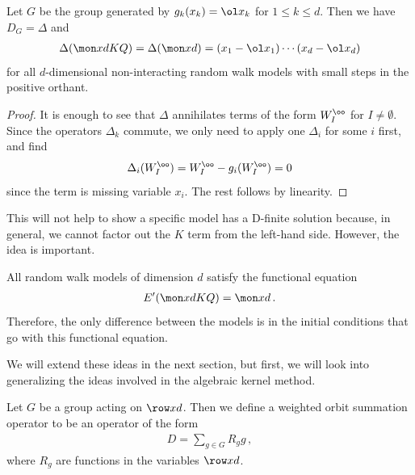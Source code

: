 \begin{theorem} Let $G$ be the group generated by $g_k(x_k) = \ol x_k$ for $1 \leq k \leq d$. Then we have $D_G = \Delta$
and
\begin{align}
	\Delta(\mon xd KQ) = \Delta(\mon xd) = (x_1 - \ol x_1)\cdots(x_d-\ol x_d)
\end{align}
for all $d$-dimensional non-interacting random walk models with small steps in the positive orthant.
\end{theorem}
\begin{proof} It is enough to see that $\Delta$ annihilates terms of the form $W_I^\oo$ for $I \neq \emptyset$. Since the operators $\Delta_k$ commute, we only need to apply one $\Delta_i$ for some $i$ first, and find
\begin{align}
	\Delta_i(W_I^\oo) = W_I^\oo - g_i(W_I^\oo) = 0
\end{align}
since the term is missing variable $x_i$. The rest follows by linearity.
\end{proof}
This will not help to show a specific model has a D-finite solution because, in general, we cannot factor out the $K$ term from the left-hand side. However, the idea is important.
\begin{corollary} All random walk models of dimension $d$ satisfy the functional equation 
\begin{align}
E'(\mon xd KQ) = \mon xd\,.
\end{align}
Therefore, the only difference between the models is in the initial conditions that go with this functional equation.
\end{corollary}

We will extend these ideas in the next section, but first, we will look into generalizing the ideas involved in the algebraic kernel method.
\begin{definition} Let $G$ be a group acting on $\row xd$. Then we define a weighted orbit summation operator to be an operator of the form
\begin{align}
	D = \sum_{g\in G}R_g g\,,
\end{align}
where $R_g$ are functions in the variables $\row xd$.
\end{definition}

